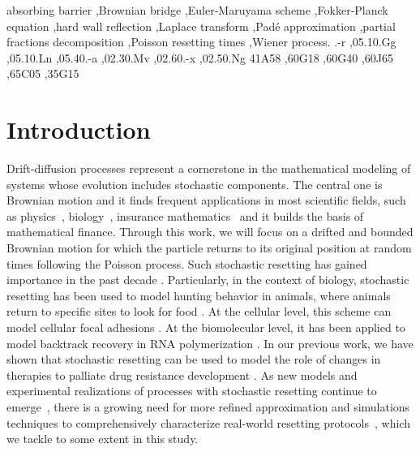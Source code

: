 \documentclass[preprint,12pt]{elsarticle}
\numberwithin{equation}{section}
\theoremstyle{plain} \newtheorem{theorem}{Theorem}[section]
\theoremstyle{plain} \newtheorem{proposition}[theorem]{Proposition}
\theoremstyle{plain} \newtheorem{lemma}[theorem]{Lemma}
\theoremstyle{plain} \newtheorem{corollary}[theorem]{Corollary}
\theoremstyle{definition} \newtheorem{definition}[theorem]{Definition}
\theoremstyle{definition} \newtheorem{notation}[theorem]{Notation}
\theoremstyle{remark} \newtheorem{remark}[theorem]{Remark}
\theoremstyle{remark} \newtheorem{remarks}[theorem]{Remarks}
\theoremstyle{remark} \newtheorem{algorithm2}[theorem]{Algorithm}
\theoremstyle{remark} \newtheorem{example}[theorem]{Example}
\begin{document}
\begin{frontmatter}
\begin{abstract}
\end{abstract}

\begin{keyword}
absorbing barrier 
\sep Brownian bridge 
\sep Euler-Maruyama scheme
\sep Fokker-Planck equation \sep hard wall reflection \sep Laplace transform  
\sep Pad\'e approximation 
\sep partial fractions decomposition
\sep Poisson resetting times 
\sep Wiener process.
.-r \sep 05.10.Gg \sep 05.10.Ln \sep 05.40.-a \sep 02.30.Mv \sep 02.60.-x \sep 02.50.Ng
\MSC 41A58 \sep 60G18 \sep 60G40 \sep 60J65 \sep 65C05 \sep 35G15
\end{keyword}

\end{frontmatter}

\tableofcontents

\newpage

\section{Introduction}

Drift-diffusion processes represent a cornerstone in the mathematical modeling of systems whose evolution includes stochastic components. 
The central one is Brownian motion and it finds frequent applications in most scientific fields, such as physics~\cite{Kampen_2007, bian2016111, libchaber2019biology, Romanczuk2012}, biology~\cite{Romanczuk2009, Woods2014, Marcovitz2013, Oshanin2009},
insurance mathematics~\cite{dufresne1991risk,gatto2016saddlepoint, gatto2012four} and it builds the basis of mathematical finance.
Through this work, we will focus on a drifted and bounded Brownian motion for which the particle returns to its original position at random times following the Poisson process. Such stochastic resetting has gained importance in the past decade \cite{Majumdar2015, evans_diffusion_2011, chechkin2018searchresettingunifiedrenewal,evans_stochastic_2020, pal_first_2019, roldan_path-integral_2017,nagar_diffusion_2016,pal_diffusion_2016,Kusmierz2014,Meylahn2015}. Particularly, in the context of biology, stochastic resetting has been used to model hunting behavior in animals, where animals return to specific sites to look for food \cite{mercado2018lotka}. At the cellular level, this scheme can model cellular focal adhesions \cite{bressloff2020stochastic}. At the biomolecular level, it has been applied to model backtrack recovery in RNA polymerization \cite{roldan2016stochastic}.  In our previous work, we have shown that stochastic resetting can be used to model the role of changes in therapies to palliate drug resistance development \cite{ramoso_stochastic_2020}. As new models and experimental realizations of processes with stochastic resetting continue to emerge~\cite{besga2020optimal,tal2020experimental}, there is a growing need for more refined approximation and simulations techniques to comprehensively characterize real-world resetting protocols~\cite{evans_stochastic_2020}, which we tackle to some extent in this study.
\end{document}

